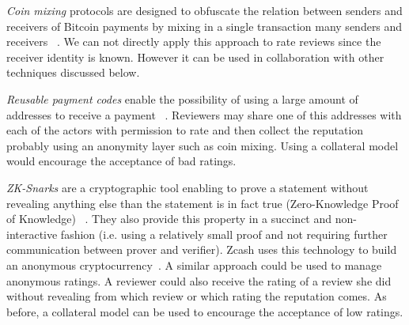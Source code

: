 \emph{Coin mixing} protocols are designed to obfuscate the relation between
senders and receivers of Bitcoin payments by mixing in a single transaction many
senders and receivers ~\cite{meiklejohn2015privacy}. We can not directly apply
this approach to rate reviews since the receiver identity is known. However it
can be used in collaboration with other techniques discussed below.

\emph{Reusable payment codes} enable the possibility of using a large amount of
addresses to receive a payment ~\cite{harrigan2016unreasonable,
  ranvierReusable}. Reviewers may share one of this addresses with each of the
actors with permission to rate and then collect the reputation probably using an
anonymity layer such as coin mixing. Using a collateral model would encourage
the acceptance of bad ratings.

\emph{ZK-Snarks} are a cryptographic tool enabling to prove a statement without
revealing anything else than the statement is in fact true (Zero-Knowledge Proof
of Knowledge) ~\cite{blum1988non,bitansky2013succinct}. They also provide this
property in a succinct and non-interactive fashion (i.e. using a relatively
small proof and not requiring further communication between prover and
verifier). Zcash uses this technology to build an anonymous
cryptocurrency~\cite{sasson2014zerocash}. A similar approach could be used to
manage anonymous ratings. A reviewer could also receive the rating of a review
she did without revealing from which review or which rating the reputation
comes. As before, a collateral model can be used to encourage the acceptance of
low ratings.

